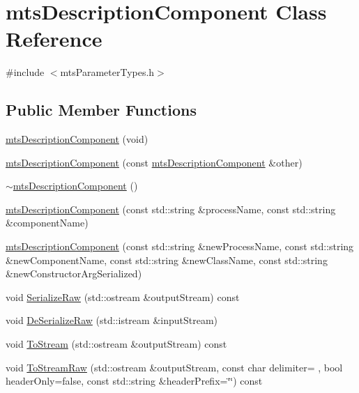 \hypertarget{classmts_description_component}{}\section{mts\+Description\+Component Class Reference}
\label{classmts_description_component}


{\ttfamily \#include $<$mts\+Parameter\+Types.\+h$>$}

\subsection*{Public Member Functions}
\begin{DoxyCompactItemize}
\item 
\hyperlink{classmts_description_component_abb1d2b4587f2b86f2070cd7d33a1fc57}{mts\+Description\+Component} (void)
\item 
\hyperlink{classmts_description_component_a15d1c237d2196cf573ce442e8ae0a597}{mts\+Description\+Component} (const \hyperlink{classmts_description_component}{mts\+Description\+Component} \&other)
\item 
\hyperlink{classmts_description_component_a891c37198cf46584c198becb27b372b9}{$\sim$mts\+Description\+Component} ()
\item 
\hyperlink{classmts_description_component_a022a329285ff0c793a588f0014373fdc}{mts\+Description\+Component} (const std\+::string \&process\+Name, const std\+::string \&component\+Name)
\item 
\hyperlink{classmts_description_component_a39f4b74c0f93187fbe8b0734eef66c01}{mts\+Description\+Component} (const std\+::string \&new\+Process\+Name, const std\+::string \&new\+Component\+Name, const std\+::string \&new\+Class\+Name, const std\+::string \&new\+Constructor\+Arg\+Serialized)
\item 
void \hyperlink{classmts_description_component_a09652ed1727c796942e2e57f8d1ab7d8}{Serialize\+Raw} (std\+::ostream \&output\+Stream) const 
\item 
void \hyperlink{classmts_description_component_a2d70966716f802b6125a997ffb80c6c1}{De\+Serialize\+Raw} (std\+::istream \&input\+Stream)
\item 
void \hyperlink{classmts_description_component_a5b044244aad1b5530e21aac0c6264bc0}{To\+Stream} (std\+::ostream \&output\+Stream) const 
\item 
void \hyperlink{classmts_description_component_ada4ea3aa4d0ac18d94f5f8dd4d4dc701}{To\+Stream\+Raw} (std\+::ostream \&output\+Stream, const char delimiter= \textquotesingle{} \textquotesingle{}, bool header\+Only=false, const std\+::string \&header\+Prefix=\char`\"{}\char`\"{}) const 

\end{DoxyCompactItemize}
